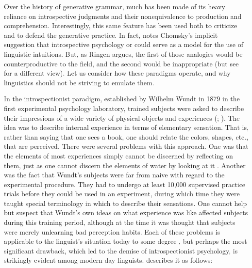 \noindent
Over the history of generative grammar, much has been made of its heavy reliance on introspective judgments and their nonequivalence to production and comprehension. Interestingly, this same feature has been used both to criticize and to defend the generative practice. In fact, \citet{Ringen1977} notes Chomsky's implicit suggestion that introspective psychology or  could serve as a model for the use of linguistic intuitions. But, as Ringen argues, the first of those analogies would be counterproductive to the field, and the second would be inappropriate (but see \citet[6\textendash{}7]{Cowart1997} for a different view). Let
us consider how these paradigms operate, and why linguistics should not be striving to emulate them.

In the introspectionist paradigm, established by Wilhelm Wundt in 1879 in the first experimental psychology laboratory, trained subjects were asked to describe their impressions of a wide variety of physical objects and experiences (\citet{Wundt1896}; \citet{Boring1953}). The idea was to describe internal experience in terms of elementary sensation. That is, rather than saying that one sees a book, one should relate the colors, shapes, etc., that are perceived. There were several problems with this approach. One was that the elements of most experiences simply cannot be discerned by reflecting on them, just as one cannot discern the elements of water by looking at it \citep{Dellarosa1988}. Another was the fact that Wundt's subjects were far from naive with regard to the experimental procedure. They had to undergo at least 10,000 supervised practice trials before they could be used in an experiment, during which time they were taught special terminology in which to describe their sensations. One cannot help but suspect that Wundt's own ideas on what experience was like affected subjects during this training period, although at the time it was thought that subjects were merely unlearning bad perception habits. Each of these problems is applicable to the linguist's situation today to some degree \citep[vol. 3]{Levelt1974}, but perhaps the most significant drawback, which led to the
demise of introspectionist psychology, is strikingly evident among modern-day linguists. \citet{Dellarosa1988} describes it as follows:

